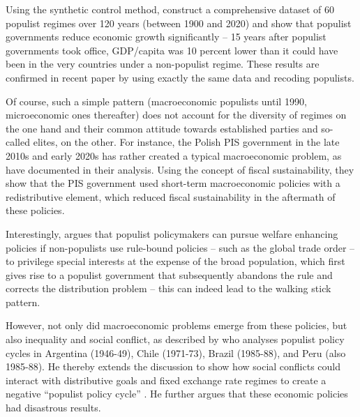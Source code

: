 \documentclass{OUP-EJ}
\begin{document}
Using the synthetic control method, \cite{FunkeEtAl2016} construct a comprehensive dataset of 60 populist regimes over 120 years (between 1900 and 2020) and show that populist governments reduce economic growth significantly – 15 years after populist governments took office, GDP/capita was 10 percent lower than it could have been in the very countries under a non-populist regime. These results are confirmed in recent paper by \cite{ChuangEtAl2024} using exactly the same data and recoding populists.

Of course, such a simple pattern (macroeconomic populists until 1990, microeconomic ones thereafter) does not account for the diversity of regimes on the one hand and their common attitude towards established parties and so-called elites, on the other. For instance, the Polish PIS government in the late 2010s and early 2020s has rather created a typical macroeconomic problem, as \cite{WysockiFreytag2024} have documented in their analysis. Using the concept of fiscal sustainability, they show that the PIS government used short-term macroeconomic policies with a redistributive element, which reduced fiscal sustainability in the aftermath of these policies.

Interestingly, \cite{Rodrik2018a} argues that populist policymakers can pursue welfare enhancing policies if non-populists use rule-bound policies – such as the global trade order – to privilege special interests at the expense of the broad population, which first gives rise to a populist government that subsequently abandons the rule and corrects the distribution problem – this can indeed lead to the walking stick pattern.

However, not only did macroeconomic problems emerge from these policies, but also inequality and social conflict, as described by \cite{Sachs1989} who analyses populist policy cycles in Argentina (1946-49), Chile (1971-73), Brazil (1985-88), and Peru (also 1985-88). He thereby extends the discussion to show how social conflicts could interact with distributive goals and fixed exchange rate regimes to create a negative “populist policy cycle” \cite[p.15]{Sachs1989}. He further argues that these economic policies had disastrous results. 
\end{document}
